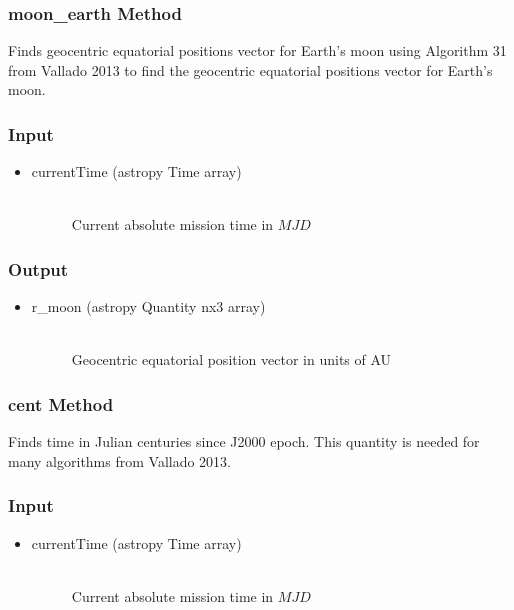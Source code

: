 \documentclass[cleanfoot]{asme2ej}
\begin{document}
\subsubsection{moon\_earth Method} 
Finds geocentric equatorial positions vector for Earth's moon using Algorithm 31 from Vallado 2013 to find the geocentric equatorial positions vector for Earth's moon.
\subsubsection*{Input}
\begin{itemize}
\item
\begin{description}
    \item[currentTime (astropy Time array)] \hfill \\ Current absolute mission time in $MJD$
\end{description}
\end{itemize}
\subsubsection*{Output}
\begin{itemize}
\item
\begin{description}
    \item[r\_moon (astropy Quantity nx3 array)] \hfill \\ Geocentric equatorial position vector in units of AU
\end{description}
\end{itemize}

\subsubsection{cent Method} 
Finds time in Julian centuries since J2000 epoch. This quantity is needed for many algorithms from Vallado 2013.
\subsubsection*{Input}
\begin{itemize}
\item
\begin{description}
    \item[currentTime (astropy Time array)] \hfill \\ Current absolute mission time in $MJD$
\end{description}
\end{itemize}
\end{document}
